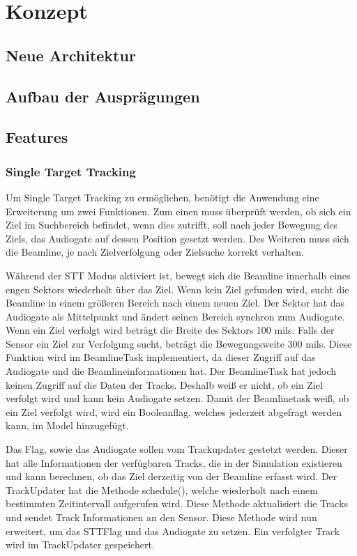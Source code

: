\chapter{Konzept}

\section{Neue Architektur}

\section{Aufbau der Ausprägungen}

\newpage
\section{Features}

\subsection{Single Target Tracking}
Um Single Target Tracking zu ermöglichen, benötigt die Anwendung eine Erweiterung um zwei Funktionen. Zum einen muss überprüft werden, ob sich ein Ziel 
im Suchbereich befindet, wenn dies zutrifft, soll nach jeder Bewegung des Ziels, das Audiogate auf dessen Position gesetzt werden. Des Weiteren muss sich 
die Beamline, je nach Zielverfolgung oder Zielsuche korrekt verhalten.

Während der STT Modus aktiviert ist, bewegt sich die Beamline innerhalb eines engen Sektors wiederholt über das Ziel. Wenn kein Ziel gefunden wird, sucht
die Beamline in einem größeren Bereich nach einem neuen Ziel. Der Sektor hat das Audiogate als Mittelpunkt und ändert seinen Bereich synchron zum 
Audiogate. Wenn ein Ziel verfolgt wird beträgt die Breite des Sektors 100 mils. Falls der Sensor ein Ziel zur Verfolgung sucht, beträgt die 
Bewegungsweite 300 mils. Diese Funktion wird im BeamlineTask implementiert, da dieser Zugriff auf das Audiogate und die Beamlineinformationen hat. Der 
BeamlineTask hat jedoch keinen Zugriff auf die Daten der Tracks. Deshalb weiß er nicht, ob ein Ziel verfolgt wird und kann kein Audiogate setzen. Damit 
der Beamlinetask weiß, ob ein Ziel verfolgt wird, wird ein Booleanflag, welches jederzeit abgefragt werden kann, im Model hinzugefügt.

Das Flag, sowie das Audiogate sollen vom Trackupdater gestetzt werden. Dieser hat alle Informationen der verfügbaren Tracks, die in der Simulation 
existieren und kann berechnen, ob das Ziel derzeitig von der Beamline erfasst wird. Der TrackUpdater hat die Methode schedule(), welche wiederholt nach 
einem bestimmten Zeitintervall aufgerufen wird. Diese Methode aktualisiert die Tracks und sendet Track Informationen an den Sensor. Diese Methode wird 
nun erweitert, um das STTFlag und das Audiogate zu setzen. Ein verfolgter Track wird im TrackUpdater gespeichert.

